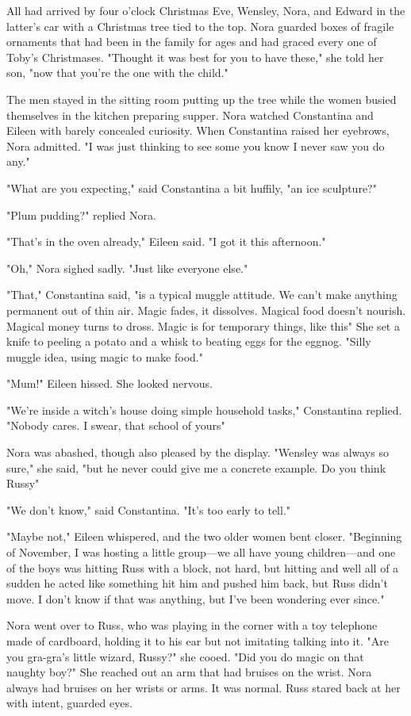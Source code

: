 All had arrived by four o'clock Christmas Eve, Wensley, Nora, and Edward in the latter's car with a Christmas tree tied to the top. Nora guarded boxes of fragile ornaments that had been in the family for ages and had graced every one of Toby's Christmases. "Thought it was best for you to have these," she told her son, "now that you're the one with the child."

The men stayed in the sitting room putting up the tree while the women busied themselves in the kitchen preparing supper. Nora watched Constantina and Eileen with barely concealed curiosity. When Constantina raised her eyebrows, Nora admitted. "I was just thinking to see some{\el} you know{\el} I never saw you do any."

"What are you expecting," said Constantina a bit huffily, "an ice sculpture?"

"Plum pudding?" replied Nora.

"That's in the oven already," Eileen said. "I got it this afternoon."

"Oh," Nora sighed sadly. "Just like everyone else."

"That," Constantina said, "is a typical muggle attitude. We can't make anything permanent out of thin air. Magic fades, it dissolves. Magical food doesn't nourish. Magical money turns to dross. Magic is for temporary things, like this{\el}" She set a knife to peeling a potato and a whisk to beating eggs for the eggnog. "Silly muggle idea, using magic to make food."

"Mum!" Eileen hissed. She looked nervous.

"We're inside a witch's house doing simple household tasks," Constantina replied. "Nobody cares. I swear, that school of yours{\el}"

Nora was abashed, though also pleased by the display. "Wensley was always so sure," she said, "but he never could give me a concrete example. Do you think Russy{\el}"

"We don't know," said Constantina. "It's too early to tell."

"Maybe not," Eileen whispered, and the two older women bent closer. "Beginning of November, I was hosting a little group—we all have young children—and one of the boys was hitting Russ with a block, not hard, but hitting and{\el} well all of a sudden he acted like something hit him and pushed him back, but Russ didn't move. I don't know if that was anything, but I've been wondering ever since."

Nora went over to Russ, who was playing in the corner with a toy telephone made of cardboard, holding it to his ear but not imitating talking into it. "Are you gra-gra's little wizard, Russy?" she cooed. "Did you do magic on that naughty boy?" She reached out an arm that had bruises on the wrist. Nora always had bruises on her wrists or arms. It was normal. Russ stared back at her with intent, guarded eyes.

